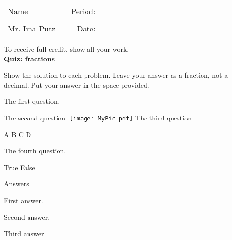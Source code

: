 \documentclass[a4paper,addpoints,12point]{exam}%
\newcommand{\assignment}{Quiz: fractions}
\newcommand{\teacher}{Mr. Ima Putz}
\begin{document}
\fontsize{17pt}{20pt}\selectfont %
\noindent
\begin{tabular}{@{}l p{1.6in}r @{}}
Name: \vrule height 0 pt depth 0.4 pt width 3.0 in & & Period: \vrule height 0 pt depth 0.4 pt width .75 in \\\\
\teacher &  &Date: \hrulefill \\
\end{tabular}
\begin{center}
To receive full credit, show all your work.\\ \vspace{.1in}
	{\bf \assignment}
\end{center}
\noindent Show the solution to each problem. Leave your answer as a fraction, not a decimal. Put your answer in the space provided.
\begin{questions}
\bracketedpoints
\question[3]
The first question.
\answerline
{}
\vspace{.15in}
\question[2]
The second question. 
\answerline
\texttt{[image: MyPic.pdf]}
\vspace{0.15in}
\question[2]
The third question.
\vspace{0.5in}
\begin{oneparcheckboxes}
\choice A
\choice B
\choice C
\choice D
\end{oneparcheckboxes}
\question[1]
The fourth question.
\begin{oneparcheckboxes}
\choice True
\choice False
\end{oneparcheckboxes}
\newpage
\begin{center}
{\large Answers}
\end{center}
\begin{solution}
First answer.
\end{solution}
\begin{solution}
Second answer.
\end{solution}
\begin{solution}
Third answer
\end{solution}
\end{questions}
\end{document}
